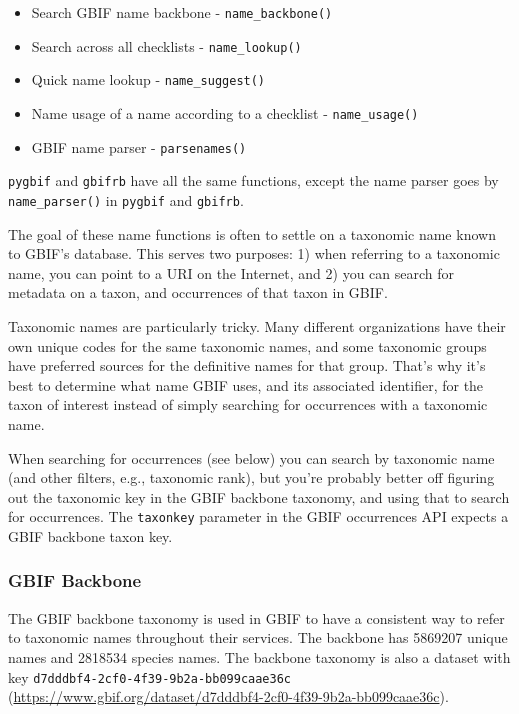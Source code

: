 \documentclass[author-year, review, 11pt]{components/elsarticle} %
\def\tightlist{}
\begin{document}
\begin{itemize}
\tightlist
\item
  Search GBIF name backbone - \texttt{name\_backbone()}
\item
  Search across all checklists - \texttt{name\_lookup()}
\item
  Quick name lookup - \texttt{name\_suggest()}
\item
  Name usage of a name according to a checklist - \texttt{name\_usage()}
\item
  GBIF name parser - \texttt{parsenames()}
\end{itemize}

\texttt{pygbif} and \texttt{gbifrb} have all the same functions, except
the name parser goes by \texttt{name\_parser()} in \texttt{pygbif} and
\texttt{gbifrb}.

The goal of these name functions is often to settle on a taxonomic name
known to GBIF's database. This serves two purposes: 1) when referring to
a taxonomic name, you can point to a URI on the Internet, and 2) you can
search for metadata on a taxon, and occurrences of that taxon in GBIF.

Taxonomic names are particularly tricky. Many different organizations
have their own unique codes for the same taxonomic names, and some
taxonomic groups have preferred sources for the definitive names for
that group. That's why it's best to determine what name GBIF uses, and
its associated identifier, for the taxon of interest instead of simply
searching for occurrences with a taxonomic name.

When searching for occurrences (see below) you can search by taxonomic
name (and other filters, e.g., taxonomic rank), but you're probably
better off figuring out the taxonomic key in the GBIF backbone taxonomy,
and using that to search for occurrences. The \texttt{taxonkey}
parameter in the GBIF occurrences API expects a GBIF backbone taxon key.

\subsubsection{GBIF Backbone}\label{gbif-backbone}

The GBIF backbone taxonomy is used in GBIF to have a consistent way to
refer to taxonomic names throughout their services. The backbone has
5869207 unique names and 2818534 species names. The backbone taxonomy is
also a dataset with key \texttt{d7dddbf4-2cf0-4f39-9b2a-bb099caae36c}
(\url{https://www.gbif.org/dataset/d7dddbf4-2cf0-4f39-9b2a-bb099caae36c}).
\end{document}
